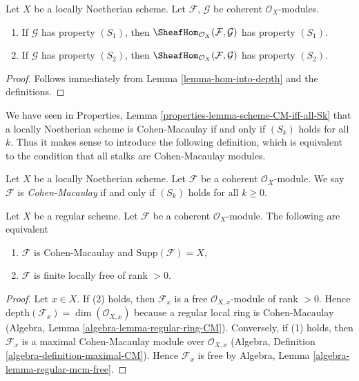 \begin{lemma}
\label{lemma-hom-into-S2}
Let $X$ be a locally Noetherian scheme. Let $\mathcal{F}$, $\mathcal{G}$
be coherent $\mathcal{O}_X$-modules.
\begin{enumerate}
\item If $\mathcal{G}$ has property $(S_1)$, then
$\SheafHom_{\mathcal{O}_X}(\mathcal{F}, \mathcal{G})$ has property $(S_1)$.
\item If $\mathcal{G}$ has property $(S_2)$, then
$\SheafHom_{\mathcal{O}_X}(\mathcal{F}, \mathcal{G})$ has property $(S_2)$.
\end{enumerate}
\end{lemma}

\begin{proof}
Follows immediately from Lemma \ref{lemma-hom-into-depth}
and the definitions.
\end{proof}

\noindent
We have seen in Properties, Lemma \ref{properties-lemma-scheme-CM-iff-all-Sk}
that a locally Noetherian
scheme is Cohen-Macaulay if and only if $(S_k)$ holds for all $k$.
Thus it makes sense to introduce the following definition, which
is equivalent to the condition that all stalks are Cohen-Macaulay modules.

\begin{definition}
\label{definition-Cohen-Macaulay}
Let $X$ be a locally Noetherian scheme.
Let $\mathcal{F}$ be a coherent $\mathcal{O}_X$-module.
We say $\mathcal{F}$ is {\it Cohen-Macaulay} if and only
if $(S_k)$ holds for all $k \geq 0$.
\end{definition}

\begin{lemma}
\label{lemma-Cohen-Macaulay-over-regular}
Let $X$ be a regular scheme. Let $\mathcal{F}$ be a coherent
$\mathcal{O}_X$-module. The following are equivalent
\begin{enumerate}
\item $\mathcal{F}$ is Cohen-Macaulay and $\text{Supp}(\mathcal{F}) = X$,
\item $\mathcal{F}$ is finite locally free of rank $> 0$.
\end{enumerate}
\end{lemma}

\begin{proof}
Let $x \in X$. If (2) holds, then $\mathcal{F}_x$ is a free
$\mathcal{O}_{X, x}$-module of rank $> 0$. Hence
$\text{depth}(\mathcal{F}_x) = \dim(\mathcal{O}_{X, x})$
because a regular local ring is Cohen-Macaulay
(Algebra, Lemma \ref{algebra-lemma-regular-ring-CM}).
Conversely, if (1) holds, then $\mathcal{F}_x$ is a
maximal Cohen-Macaulay module over $\mathcal{O}_{X, x}$
(Algebra, Definition \ref{algebra-definition-maximal-CM}).
Hence $\mathcal{F}_x$ is free by
Algebra, Lemma \ref{algebra-lemma-regular-mcm-free}.
\end{proof}









